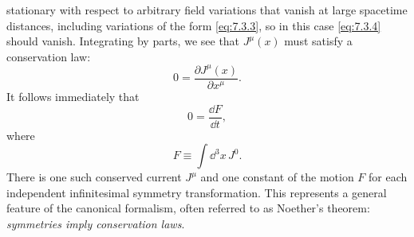 stationary with respect to arbitrary field variations that vanish at large
spacetime distances, including variations of the form \eqref{eq:7.3.3}, so in this case
\eqref{eq:7.3.4} should vanish. Integrating by parts, we see that $J^\mu(x)$ must satisfy
a conservation law:
\begin{equation}
0=\frac{\partial J^\mu(x)}{\partial x^\mu}.
\tag{7.3.5}\label{eq:7.3.5}
\end{equation}
It follows immediately that
\begin{equation}
0=\frac{\dd F}{\dd t},
\tag{7.3.6}\label{eq:7.3.6}
\end{equation}
where
\begin{equation}
F\equiv\int \dd^3x\,J^0.
\tag{7.3.7}\label{eq:7.3.7}
\end{equation}
There is one such conserved current $J^\mu$ and one constant of the motion $F$
for each independent infinitesimal symmetry transformation. This represents a
general feature of the canonical formalism, often referred to as Noether's
theorem: \emph{symmetries imply conservation laws}.

